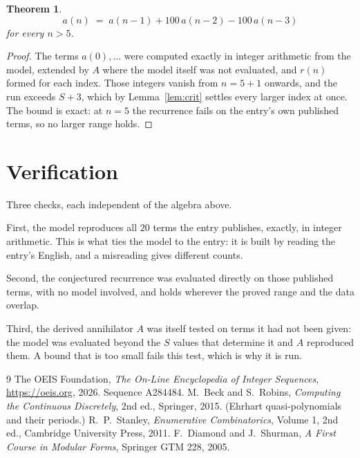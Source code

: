 \documentclass[11pt,a4paper]{article}
\theoremstyle{plain}
\newtheorem{theorem}{Theorem}
\theoremstyle{definition}
\begin{document}
\begin{theorem}
\[
a(n)\;=\;a(n-1) + 100\,a(n-2) - 100\,a(n-3)
\]
for every $n>5$.
\end{theorem}

\begin{proof}
The terms $a(0),\dots$ were computed exactly in integer arithmetic from the model, extended by
$A$ where the model itself was not evaluated, and $r(n)$ formed for each index. Those integers
vanish from $n=5+1$ onwards, and the run exceeds $S+3$, which by
Lemma~\ref{lem:crit} settles every larger index at once. The bound is exact: at $n=5$ the recurrence fails on the entry's own published terms, so no larger range holds.
\end{proof}

\section{Verification}

Three checks, each independent of the algebra above.

First, the model reproduces all $20$ terms the entry publishes, exactly, in integer
arithmetic. This is what ties the model to the entry: it is built by reading the entry's
English, and a misreading gives different counts.

Second, the conjectured recurrence was evaluated directly on those published terms, with no
model involved, and holds wherever the proved range and the data overlap.

Third, the derived annihilator $A$ was itself tested on terms it had not been given: the model
was evaluated beyond the $S$ values that determine it and $A$ reproduced them. A bound that is
too small fails this test, which is why it is run.

\begin{thebibliography}{9}
 The OEIS Foundation, \emph{The On-Line Encyclopedia of Integer
Sequences}, \url{https://oeis.org}, 2026. Sequence A284484.
 M.~Beck and S.~Robins, \emph{Computing the Continuous Discretely},
2nd ed., Springer, 2015. (Ehrhart quasi-polynomials and their periods.)
 R.~P.~Stanley, \emph{Enumerative Combinatorics}, Volume 1, 2nd ed.,
Cambridge University Press, 2011.
 F.~Diamond and J.~Shurman, \emph{A First Course in Modular Forms},
Springer GTM 228, 2005.
\end{thebibliography}
\end{document}
